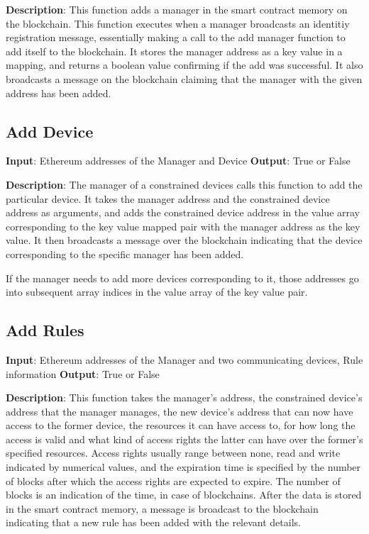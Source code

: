\documentclass[english]{tktltiki}
\begin{document}
\textbf{Description}:
This function adds a manager in the smart contract memory on the blockchain. This function executes when a manager broadcasts an identitiy registration message, essentially making a call to the add manager function to add itself to the blockchain. It stores the manager address as a key value in a mapping, and returns a boolean value confirming if the add was successful. It also broadcasts a message on the blockchain claiming that the manager with the given address has been added. 

\subsection*{Add Device}
\textbf{Input}: Ethereum addresses of the Manager and Device\newline
\textbf{Output}: True or False\newline

\textbf{Description}: The manager of a constrained devices calls this function to add the particular device. It takes the manager address and the constrained device address as arguments, and adds the constrained device address in the value array corresponding to the key value mapped pair with the manager address as the key value. It then broadcasts a message over the blockchain indicating that the device corresponding to the specific manager has been added.

If the manager needs to add more devices corresponding to it, those addresses go into subsequent array indices in the value array of the key value pair. 

\subsection*{Add Rules}
\textbf{Input}: Ethereum addresses of the Manager and two communicating devices, Rule information\newline
\textbf{Output}: True or False\newline

\textbf{Description}: This function takes the manager's address, the constrained device's address that the manager manages, the new device's address that can now have access to the former device, the resources it can have access to, for how long the access is valid and what kind of access rights the latter can have over the former's specified resources. Access rights usually range between none, read and write indicated by numerical values, and the expiration time is specified by the number of blocks after which the access rights are expected to expire. The number of blocks is an indication of the time, in case of blockchains. After the data is stored in the smart contract memory, a message is broadcast to the blockchain indicating that a new rule has been added with the relevant details.
\end{document}

